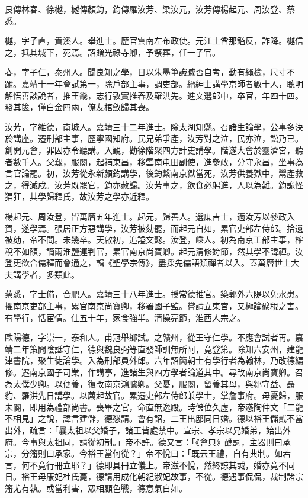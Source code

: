 \begin{pinyinscope}
艮傳林春、徐樾，樾傳顏鈞，鈞傳羅汝芳、梁汝元，汝芳傳楊起元、周汝登、蔡悉。

樾，字子直，貴溪人。舉進士。歷官雲南左布政使。元江土酋那鑑反，詐降。樾信之，抵其城下，死焉。詔贈光祿寺卿，予祭葬，任一子官。

春，字子仁，泰州人。聞良知之學，日以朱墨筆識臧否自考，動有繩檢，尺寸不踰。嘉靖十一年會試第一，除戶部主事，調吏部。縉紳士講學京師者數十人，聰明解悟善談說者，推王畿，志行敦實推春及羅洪先。進文選郎中，卒官，年四十四。發其篋，僅白金四兩，僚友棺斂歸其喪。

汝芳，字維德，南城人。嘉靖三十二年進士。除太湖知縣。召諸生論學，公事多決於講座。遷刑部主事，歷寧國知府。民兄弟爭產，汝芳對之泣，民亦泣，訟乃已。創開元會，罪囚亦令聽講。入覲，勸徐階聚四方計吏講學。階遂大會於靈濟宮，聽者數千人。父艱，服闋，起補東昌，移雲南屯田副使，進參政，分守永昌，坐事為言官論罷。初，汝芳從永新顏鈞講學，後鈞繫南京獄當死，汝芳供養獄中，鬻產救之，得減戍。汝芳既罷官，鈞亦赦歸。汝芳事之，飲食必躬進，人以為難。鈞詭怪猖狂，其學歸釋氏，故汝芳之學亦近釋。

楊起元、周汝登，皆萬曆五年進士。起元，歸善人。選庶吉士，適汝芳以參政入賀，遂學焉。張居正方惡講學，汝芳被劾罷，而起元自如，累官吏部左侍郎。拾遺被劾，帝不問。未幾卒。天啟初，追謚文懿。汝登，嵊人。初為南京工部主事，榷稅不如額，謫兩淮鹽運判官，累官南京尚寶卿。起元清修姱節，然其學不諱禪。汝登更欲合儒釋而會通之，輯《聖學宗傳》，盡採先儒語類禪者以入。蓋萬曆世士大夫講學者，多類此。

蔡悉，字士備，合肥人。嘉靖三十八年進士。授常德推官。築郭外六隄以免水患。擢南京吏部主事，累官南京尚寶卿，移署國子監。嘗請立東宮，又極論礦稅之害。有學行，恬宦情。仕五十年，家食強半。清操亮節，淮西人宗之。

歐陽德，字崇一，泰和人。甫冠舉鄉試。之贛州，從王守仁學。不應會試者再。嘉靖二年策問陰詆守仁，德與魏良弼等直發師訓無所阿，竟登第。除知六安州，建龍津書院，聚生徒論學。入為刑部員外郎。六年詔簡朝士有學行者為翰林，乃改德編修。遷南京國子司業，作講亭，進諸生與四方學者論道其中。尋改南京尚寶卿。召為太僕少卿。以便養，復改南京鴻臚卿。父憂，服闋，留養其母，與鄒守益、聶豹、羅洪先日講學。以薦起故官。累遷吏部左侍郎兼學士，掌詹事府。母憂歸，服未闋，即用為禮部尚書。喪畢之官，命直無逸殿。時儲位久虛，帝惑陶仲文「二龍不相見」之說，諱言建儲，德懇請。會有詔，二王出邸同日婚。德以裕王儲貳不當出外，疏言：「曩太祖以父婚子，諸王皆處禁中。宣宗、孝宗以兄婚弟，始出外府。今事與太祖同，請從初制。」帝不許。德又言：「《會典》醮詞，主器則曰承宗，分籓則曰承家。今裕王當何從？」帝不悅曰：「既云王禮，自有典制。如若言，何不竟行冊立耶？」德即具冊立儀上。帝滋不悅，然終諒其誠，婚亦竟不同日。裕王母康妃杜氏薨，德請用成化朝紀淑妃故事，不從。德遇事侃侃，裁制諸宗籓尤有執。或當利害，眾相顧色戰，德意氣自如。


\end{pinyinscope}
